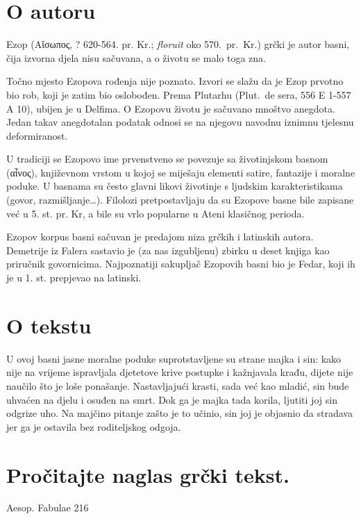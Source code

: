 \section*{O autoru}

Ezop \textgreek[variant=ancient]{(Αἴσωπος,} ? 620-564. pr. Kr.; \textit{floruit} oko 570.\ pr.~Kr.) grčki je autor basni, čija izvorna djela nisu sačuvana, a o životu se malo toga zna.

Točno mjesto Ezopova rođenja nije poznato. Izvori se slažu da je Ezop prvotno bio rob, koji je zatim bio oslobođen. Prema Plutarhu (Plut.\ de sera, 556 E 1-557 A 10), ubijen je u Delfima. O Ezopovu životu je sačuvano mnoštvo anegdota. Jedan takav anegdotalan podatak odnosi se na njegovu navodnu iznimnu tjelesnu deformiranost.

U tradiciji se Ezopovo ime prvenstveno se povezuje sa životinjskom basnom \textgreek[variant=ancient]{(αἶνος),} književnom vrstom u kojoj se miješaju elementi satire, fantazije i moralne poduke. U basnama su često glavni likovi životinje s ljudskim karakteristikama (govor, razmišljanje\dots). Filolozi pretpostavljaju da su Ezopove basne bile zapisane već u 5. st. pr. Kr, a bile su vrlo popularne u Ateni klasičnog perioda.

Ezopov korpus basni sačuvan je predajom niza grčkih i latinskih autora. Demetrije iz Falera sastavio je (za nas izgubljenu) zbirku u deset knjiga kao priručnik govornicima. Najpoznatiji sakupljač Ezopovih basni bio je Fedar, koji ih je u 1. st. prepjevao na latinski.


\section*{O tekstu}

U ovoj basni jasne moralne poduke suprotstavljene su strane majka i sin: kako nije na vrijeme ispravljala djetetove krive postupke i kažnjavala krađu, dijete nije naučilo što je loše ponašanje. Nastavljajući krasti, sada već kao mladić, sin bude uhvaćen na djelu i osuđen na smrt. Dok ga je majka tada korila, ljutiti joj sin odgrize uho. Na majčino pitanje zašto je to učinio, sin joj je objasnio da stradava jer ga je ostavila bez roditeljskog odgoja.

\section*{Pročitajte naglas grčki tekst.}

Aesop. Fabulae 216

